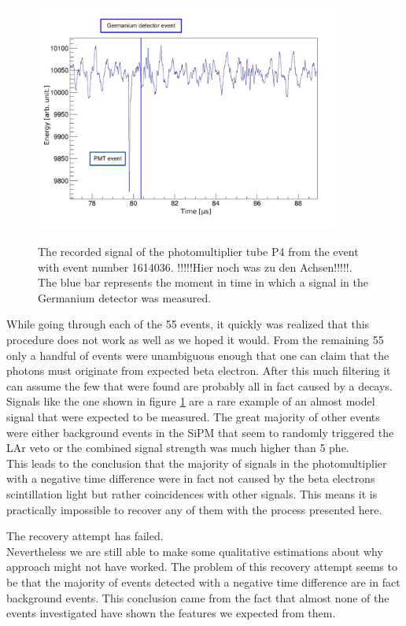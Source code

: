 \documentclass[encoding=utf8,british]{tumphthesis}
\begin{document}
\begin{figure}[t!]
	\centering
	\ifmakefigures%
	\includegraphics[width=100mm]{./Bilder/BeispielSignal.pdf}
	\fi%
	\label{fig:BeispielSignal}
	\caption{
    The recorded signal of the photomultiplier tube P4 from the event with event number 1614036. !!!!!Hier noch was zu den Achsen!!!!!. 
    The blue bar represents the moment in time in which a signal in the Germanium detector was measured.
	}
\end{figure}

While going through each of the 55 events, it quickly was realized that this procedure does not work as well as we hoped it would.
From the remaining 55 only a handful of events were unambiguous enough that one can claim that the photons must originate from expected beta electron.
After this much filtering it can assume the few that were found are probably all in fact caused by a \Kr decays.
Signals like the one shown in figure \ref{fig:BeispielSignal} are a rare example of an almost model signal that were expected to be measured.
The great majority of other events were either background events in the SiPM that seem to randomly triggered the LAr veto or the combined signal strength was much higher than 5 phe.\\

This leads to the conclusion that the majority of signals in the photomultiplier with a negative time difference were in fact not caused by the beta electrons scintillation light but rather coincidences with other signals.
This means it is practically impossible to recover any of them with the process presented here.

The recovery attempt has failed.
\\

Nevertheless we are still able to make some qualitative estimations about why approach might not have worked. 
The problem of this recovery attempt seems to be that the majority of events detected with a negative time difference are in fact background events.
This conclusion came from the fact that almost none of the events investigated have shown the features we expected from them.
\end{document}
